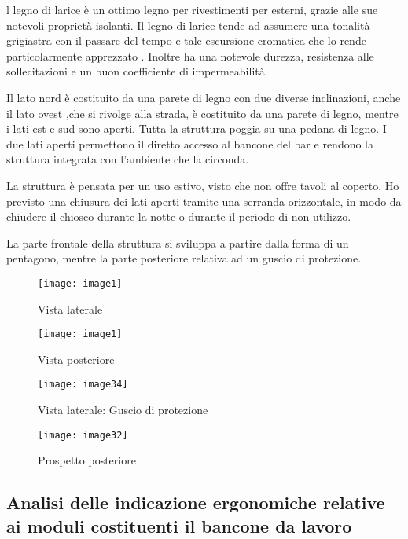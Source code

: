 l legno di larice è un ottimo legno per rivestimenti per esterni, grazie alle sue notevoli proprietà isolanti. Il legno di larice tende ad assumere una tonalità grigiastra con il passare del tempo e tale escursione cromatica che lo  rende particolarmente apprezzato . 
Inoltre ha una notevole durezza, resistenza alle sollecitazioni e un buon coefficiente di impermeabilità. 




Il lato nord è costituito da una parete di legno con due diverse inclinazioni, anche il lato ovest ,che si rivolge alla strada, è costituito da una parete di legno, mentre i lati est e sud sono aperti.
Tutta la struttura poggia su una pedana di legno.
I due lati aperti permettono il diretto accesso al bancone del bar e rendono la struttura integrata con l’ambiente che la circonda. 

La struttura è pensata per un uso estivo, visto che non offre tavoli al coperto. 
Ho previsto una chiusura dei lati aperti tramite una serranda orizzontale, 
in modo da chiudere il chiosco durante la notte o durante il periodo di non utilizzo. 

La parte frontale della struttura si sviluppa a partire dalla forma di un pentagono, mentre la parte posteriore relativa ad un guscio di protezione.

\begin{figure}[H]
	\centering
	\texttt{[image: image1]}
	\caption{Vista laterale}
	\label{fig:mesh1}
\end{figure}

\begin{figure}[H]
	\centering
	\texttt{[image: image1]}
	\caption{Vista posteriore}
	\label{fig:mesh1}
\end{figure}

\begin{figure}[H]
	\centering
	\texttt{[image: image34]}
	\caption{Vista laterale: Guscio di protezione}
	\label{fig:mesh1}
\end{figure}

\begin{figure}[H]
	\centering
	\texttt{[image: image32]}
	\caption{Prospetto posteriore}
	\label{fig:mesh1}
\end{figure}


\subsection{Analisi delle indicazione ergonomiche relative ai moduli costituenti il bancone da lavoro }

